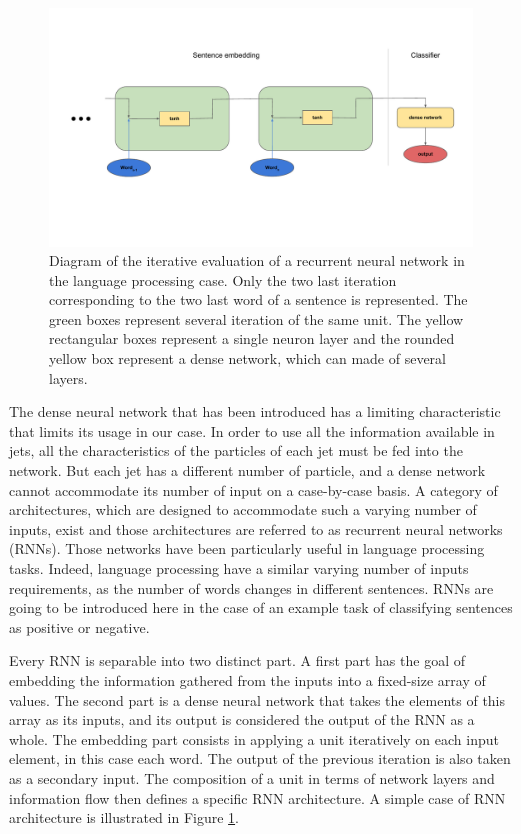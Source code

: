 \begin{figure}
    \centering
    \includegraphics[width=\textwidth]{Images/Schema_RNN.pdf}
    \caption{Diagram of the iterative evaluation of a recurrent neural network in the language processing case. Only the two last iteration corresponding to the two last word of a sentence is represented. The green boxes represent several iteration of the same unit. The yellow rectangular boxes represent a single neuron layer and the rounded yellow box represent a dense network, which can made of several layers.}
    \label{fig:recurrent_network}
\end{figure}

The dense neural network that has been introduced has a limiting characteristic that limits its usage in our case. In order to use all the information available in jets, all the characteristics of the particles of each jet must be fed into the network. But each jet has a different number of particle, and a dense network cannot accommodate its number of input on a case-by-case basis. A category of architectures, which are designed to accommodate such a varying number of inputs, exist and those architectures are referred to as recurrent neural networks (RNNs). Those networks have been particularly useful in language processing tasks. Indeed, language processing have a similar varying number of inputs requirements, as the number of words changes in different sentences. RNNs are going to be introduced here in the case of an example task of classifying sentences as positive or negative.

Every RNN is separable into two distinct part. A first part has the goal of embedding the information gathered from the inputs into a fixed-size array of values. The second part is a dense neural network that takes the elements of this array as its inputs, and its output is considered the output of the RNN as a whole. The embedding part consists in applying a unit iteratively on each input element, in this case each word. The output of the previous iteration is also taken as a secondary input. The composition of a unit in terms of network layers and information flow then defines a specific RNN architecture. A simple case of RNN architecture is illustrated in Figure \ref{fig:recurrent_network}.

